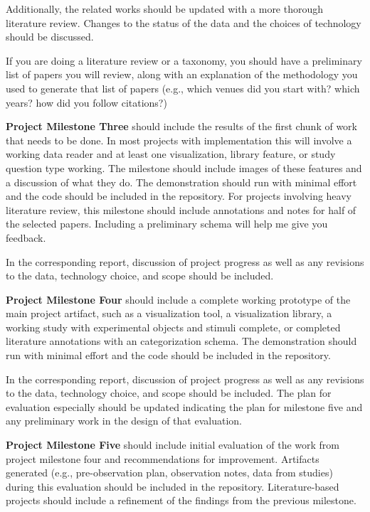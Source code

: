 Additionally, the related works should be updated with a more thorough
literature review. Changes to the status of the data and the choices of
technology should be discussed.

If you are doing a literature review or a taxonomy, you should have a
preliminary list of papers you will review, along with an explanation of the
methodology you used to generate that list of papers (e.g., which venues did
you start with? which years? how did you follow citations?)

\vspace{1.5ex}\noindent\textbf{Project Milestone Three} should include the
results of the first chunk of work that needs to be done. In most projects
with implementation this will involve a working data reader and at least one visualization,
library feature, or study question type working. The milestone should include
images of these features and a discussion of what they do. The demonstration
should run with minimal effort and the code should be included in the
repository. For projects involving heavy literature review, this milestone
should include annotations and notes for half of the selected papers.
Including a preliminary schema will help me give you feedback.

In the corresponding report, discussion of project progress as well as any
revisions to the data, technology choice, and scope should be included.

\vspace{1.5ex}\noindent\textbf{Project Milestone Four} should include a
complete working prototype of the main project artifact, such as a
visualization tool, a visualization library, a working study with experimental
objects and stimuli complete, or completed literature annotations with an
categorization schema. The demonstration should run with minimal effort and
the code should be included in the repository.

In the corresponding report, discussion of project progress as well as any
revisions to the data, technology choice, and scope should be included. The
plan for evaluation especially should be updated indicating the plan for
milestone five and any preliminary work in the design of that evaluation.


\vspace{1.5ex}\noindent\textbf{Project Milestone Five} should include initial
evaluation of the work from project milestone four and recommendations for
improvement. Artifacts generated (e.g., pre-observation
plan, observation notes, data from studies) during this evaluation should be
included in the repository. Literature-based projects should include a
refinement of the findings from the previous milestone.




